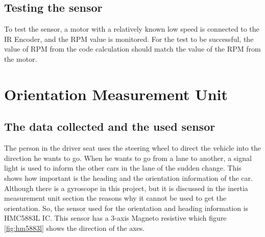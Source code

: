 \subsection{Testing the sensor}
To test the sensor, a motor with a relatively known low speed is connected to the IR Encoder, and the RPM value is monitored.
For the test to be successful, the value of RPM from the code calculation should match the value of the RPM from the motor.

\section{Orientation Measurement Unit}
\subsection{The data collected and the used sensor}
The person in the driver seat uses the steering wheel to direct the vehicle into the direction he wants to go. When he wants to go from a lane to another, a signal light is used to inform the other cars in the lane of the sudden change. This shows how important is the heading and the orientation information of the car.
Although there is a gyroscope in this project, but it is discussed in the inertia measurement unit section the reasons why it cannot be used to get the orientation.
So, the sensor used for the orientation and heading information is HMC5883L IC.
This sensor has a 3-axis Magneto resistive which figure \ref{fig:hm5883l} shows the direction of the axes.

